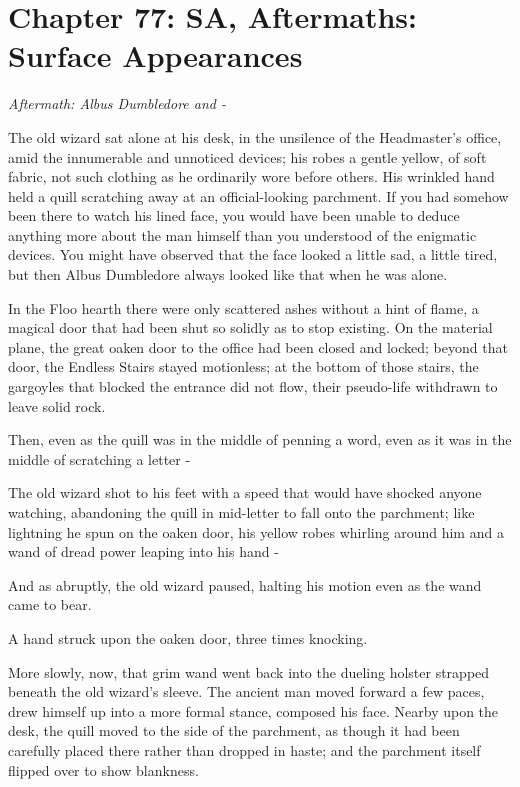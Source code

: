\chapter{Chapter 77: SA, Aftermaths: Surface Appearances}
\emph{Aftermath: Albus Dumbledore and -}

The old wizard sat alone at his desk, in the unsilence of the Headmaster's office, amid the innumerable and unnoticed devices; his robes a gentle yellow, of soft fabric, not such clothing as he ordinarily wore before others. His wrinkled hand held a quill scratching away at an official-looking parchment. If you had somehow been there to watch his lined face, you would have been unable to deduce anything more about the man himself than you understood of the enigmatic devices. You might have observed that the face looked a little sad, a little tired, but then Albus Dumbledore always looked like that when he was alone.

In the Floo hearth there were only scattered ashes without a hint of flame, a magical door that had been shut so solidly as to stop existing. On the material plane, the great oaken door to the office had been closed and locked; beyond that door, the Endless Stairs stayed motionless; at the bottom of those stairs, the gargoyles that blocked the entrance did not flow, their pseudo-life withdrawn to leave solid rock.

Then, even as the quill was in the middle of penning a word, even as it was in the middle of scratching a letter -

The old wizard shot to his feet with a speed that would have shocked anyone watching, abandoning the quill in mid-letter to fall onto the parchment; like lightning he spun on the oaken door, his yellow robes whirling around him and a wand of dread power leaping into his hand -

And as abruptly, the old wizard paused, halting his motion even as the wand came to bear.

A hand struck upon the oaken door, three times knocking.

More slowly, now, that grim wand went back into the dueling holster strapped beneath the old wizard's sleeve. The ancient man moved forward a few paces, drew himself up into a more formal stance, composed his face. Nearby upon the desk, the quill moved to the side of the parchment, as though it had been carefully placed there rather than dropped in haste; and the parchment itself flipped over to show blankness.

